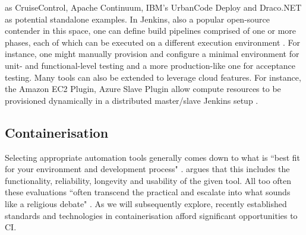 \documentclass{report}
\begin{document}
as CruiseControl, Apache Continuum, IBM's UrbanCode Deploy and Draco.NET 
as potential standalone examples. In Jenkins, also a popular open-source contender in this space, 
one can define build pipelines comprised of one or more phases, each of which can be executed on a different  
execution environment \citep{Smart}. For instance, one might manually provision and configure a 
minimal environment for unit- and functional-level testing and a more production-like 
one for acceptance testing. Many tools can also be extended to leverage cloud features. For instance,
the Amazon EC2 Plugin, Azure Slave Plugin allow compute resources to be provisioned dynamically
 in a distributed master/slave Jenkins setup \citep{Smart}.

\subsection{Containerisation}
Selecting appropriate automation tools
generally comes down to what is ``best fit for your
environment and development process" \citep{Duvall}. 
\citet{Duvall} argues that this includes the functionality, reliability, longevity and 
usability of the given tool. All too often these
evaluations ``often transcend the practical and 
escalate into what sounds like a religious debate" \citet{Duvall}. 
As we will subsequently explore, recently established 
standards and technologies in containerisation 
afford significant opportunities to CI.
\end{document}
